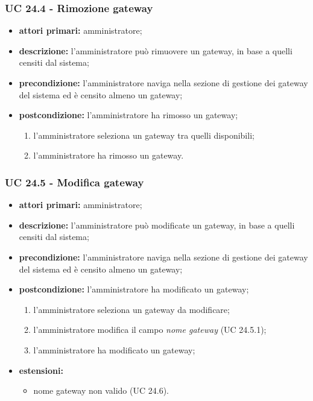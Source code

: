 			\subsubsection{UC 24.4 - Rimozione gateway}
			\begin{itemize}
				\item \textbf{attori primari:} amministratore;
				\item \textbf{descrizione:} l'amministratore può rimuovere un gateway, in base a quelli censiti dal sistema;
				\item \textbf{precondizione:} l'amministratore naviga nella sezione di gestione dei gateway del sistema ed è censito almeno un gateway;
				\item \textbf{postcondizione:} l'amministratore ha rimosso un gateway;
				\begin{enumerate}
					\item{l'amministratore seleziona un gateway tra quelli disponibili;}
					\item{l'amministratore ha rimosso un gateway.}
				\end{enumerate} 
			\end{itemize}

			\subsubsection{UC 24.5 - Modifica gateway}
			\begin{itemize}
				\item \textbf{attori primari:} amministratore;
				\item \textbf{descrizione:} l'amministratore può modificate un gateway, in base a quelli censiti dal sistema;
				\item \textbf{precondizione:} l'amministratore naviga nella sezione di gestione dei gateway del sistema ed è censito almeno un gateway;
				\item \textbf{postcondizione:} l'amministratore ha modificato un gateway;
				\begin{enumerate}
					\item{l'amministratore seleziona un gateway da modificare;}
					\item{l'amministratore modifica il campo \textit{nome gateway} (UC 24.5.1);}
					\item{l'amministratore ha modificato un gateway;}
				\end{enumerate} 
				\item \textbf{estensioni:}
				\begin{itemize}
					\item nome gateway non valido (UC 24.6).
				\end{itemize}
			\end{itemize}

